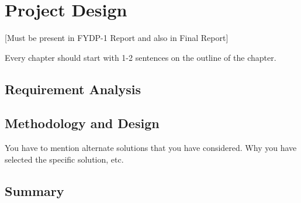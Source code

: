 \chapter{Project Design}

[Must be present in FYDP-1 Report and also in Final Report]

Every chapter should start with 1-2 sentences on the outline of the chapter.

\section{Requirement Analysis}
\section{Methodology and Design}
You have to mention alternate solutions that you have considered. Why you have selected the specific solution, etc.
\section{Summary}
